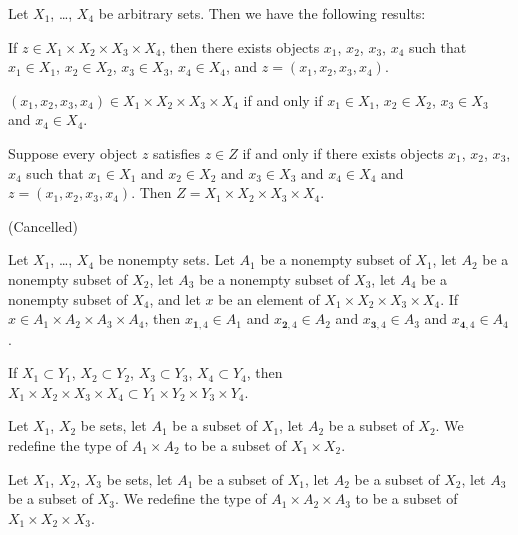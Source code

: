 \documentclass{article}
\begin{document}
Let $X_{1}$, \dots, $X_{4}$ be arbitrary sets. Then we have the
following results:
\begin{thm}
\item\label{mcart1:79} If $z\in X_{1}\times X_{2}\times X_{3}\times X_{4}$,
  then there exists objects $x_{1}$, $x_{2}$, $x_{3}$, $x_{4}$ such that
  $x_{1}\in X_{1}$, $x_{2}\in X_{2}$, $x_{3}\in X_{3}$, $x_{4}\in X_{4}$,
  and $z=(x_{1},x_{2},x_{3},x_{4})$.
\item\label{mcart1:80} $(x_{1},x_{2},x_{3},x_{4})\in X_{1}\times X_{2}\times X_{3}\times X_{4}$
  if and only if
  $x_{1}\in X_{1}$, $x_{2}\in X_{2}$, $x_{3}\in X_{3}$ and $x_{4}\in X_{4}$.
\item\label{mcart1:81} Suppose every object $z$ satisfies $z\in Z$
  if and only if there exists objects $x_{1}$, $x_{2}$, $x_{3}$, $x_{4}$
  such that
  $x_{1}\in X_{1}$ and $x_{2}\in X_{2}$ and $x_{3}\in X_{3}$ and
  $x_{4}\in X_{4}$ and $z=(x_{1},x_{2},x_{3},x_{4})$.
  Then $Z=X_{1}\times X_{2}\times X_{3}\times X_{4}$.
\item\label{mcart1:82} (Cancelled)
\item\label{mcart1:83} Let $X_{1}$, \dots, $X_{4}$ be nonempty sets.
  Let $A_{1}$ be a nonempty subset of $X_{1}$,
  let $A_{2}$ be a nonempty subset of $X_{2}$,
  let $A_{3}$ be a nonempty subset of $X_{3}$,
  let $A_{4}$ be a nonempty subset of $X_{4}$,
  and let $x$ be an element of $X_{1}\times X_{2}\times X_{3}\times X_{4}$.
  If $x\in A_{1}\times A_{2}\times A_{3}\times A_{4}$,
  then $x_{\mathbf{1},4}\in A_{1}$
  and $x_{\mathbf{2},4}\in A_{2}$
  and $x_{\mathbf{3},4}\in A_{3}$
  and $x_{\mathbf{4},4}\in A_{4}$.
\item\label{mcart1:84} If $X_{1}\subset Y_{1}$,
  $X_{2}\subset Y_{2}$, $X_{3}\subset Y_{3}$, $X_{4}\subset Y_{4}$,
  then $X_{1}\times X_{2}\times X_{3}\times X_{4}\subset Y_{1}\times Y_{2}\times Y_{3}\times Y_{4}$.
\end{thm}

\begin{definition}
Let $X_{1}$, $X_{2}$ be sets, let $A_{1}$ be a subset of $X_{1}$, let
$A_{2}$ be a subset of $X_{2}$. We redefine the type of $A_{1}\times A_{2}$
to be a subset of $X_{1}\times X_{2}$.
\end{definition}

\begin{definition}
Let $X_{1}$, $X_{2}$, $X_{3}$ be sets, let $A_{1}$ be a subset of $X_{1}$, let
$A_{2}$ be a subset of $X_{2}$, let $A_{3}$ be a subset of $X_{3}$.
We redefine the type of $A_{1}\times A_{2}\times A_{3}$
to be a subset of $X_{1}\times X_{2}\times X_{3}$.
\end{definition}
\end{document}
